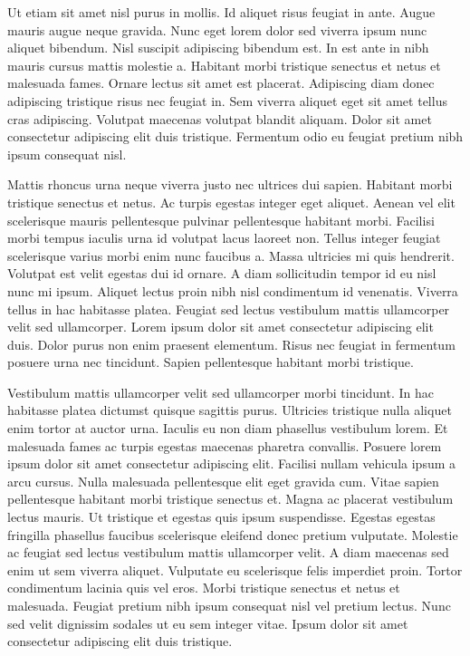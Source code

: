 Ut etiam sit amet nisl purus in mollis. Id aliquet risus feugiat in ante. Augue mauris augue neque gravida. Nunc eget lorem dolor sed viverra ipsum nunc aliquet bibendum. Nisl suscipit adipiscing bibendum est. In est ante in nibh mauris cursus mattis molestie a. Habitant morbi tristique senectus et netus et malesuada fames. Ornare lectus sit amet est placerat. Adipiscing diam donec adipiscing tristique risus nec feugiat in. Sem viverra aliquet eget sit amet tellus cras adipiscing. Volutpat maecenas volutpat blandit aliquam. Dolor sit amet consectetur adipiscing elit duis tristique. Fermentum odio eu feugiat pretium nibh ipsum consequat nisl.

Mattis rhoncus urna neque viverra justo nec ultrices dui sapien. Habitant morbi tristique senectus et netus. Ac turpis egestas integer eget aliquet. Aenean vel elit scelerisque mauris pellentesque pulvinar pellentesque habitant morbi. Facilisi morbi tempus iaculis urna id volutpat lacus laoreet non. Tellus integer feugiat scelerisque varius morbi enim nunc faucibus a. Massa ultricies mi quis hendrerit. Volutpat est velit egestas dui id ornare. A diam sollicitudin tempor id eu nisl nunc mi ipsum. Aliquet lectus proin nibh nisl condimentum id venenatis. Viverra tellus in hac habitasse platea. Feugiat sed lectus vestibulum mattis ullamcorper velit sed ullamcorper. Lorem ipsum dolor sit amet consectetur adipiscing elit duis. Dolor purus non enim praesent elementum. Risus nec feugiat in fermentum posuere urna nec tincidunt. Sapien pellentesque habitant morbi tristique.

Vestibulum mattis ullamcorper velit sed ullamcorper morbi tincidunt. In hac habitasse platea dictumst quisque sagittis purus. Ultricies tristique nulla aliquet enim tortor at auctor urna. Iaculis eu non diam phasellus vestibulum lorem. Et malesuada fames ac turpis egestas maecenas pharetra convallis. Posuere lorem ipsum dolor sit amet consectetur adipiscing elit. Facilisi nullam vehicula ipsum a arcu cursus. Nulla malesuada pellentesque elit eget gravida cum. Vitae sapien pellentesque habitant morbi tristique senectus et. Magna ac placerat vestibulum lectus mauris. Ut tristique et egestas quis ipsum suspendisse. Egestas egestas fringilla phasellus faucibus scelerisque eleifend donec pretium vulputate. Molestie ac feugiat sed lectus vestibulum mattis ullamcorper velit. A diam maecenas sed enim ut sem viverra aliquet. Vulputate eu scelerisque felis imperdiet proin. Tortor condimentum lacinia quis vel eros. Morbi tristique senectus et netus et malesuada. Feugiat pretium nibh ipsum consequat nisl vel pretium lectus. Nunc sed velit dignissim sodales ut eu sem integer vitae. Ipsum dolor sit amet consectetur adipiscing elit duis tristique.

